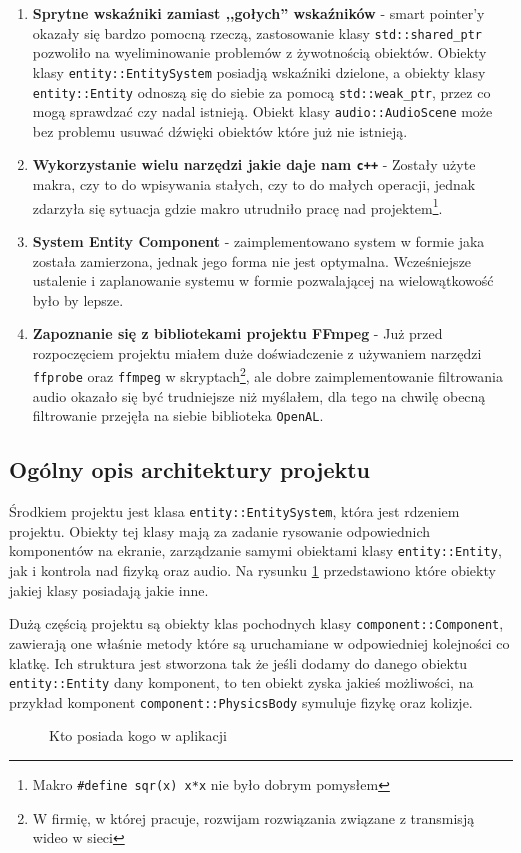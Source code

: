 \documentclass[a4paper,11pt]{article}
\begin{document}
\begin{enumerate}
    \item \textbf{Sprytne wskaźniki zamiast ,,gołych'' wskaźników} - smart pointer'y okazały się bardzo pomocną rzeczą, zastosowanie klasy \texttt{std::shared\_ptr} pozwoliło na wyeliminowanie problemów z żywotnością obiektów. Obiekty klasy \texttt{entity::EntitySystem} posiadją wskaźniki dzielone, a obiekty klasy \texttt{entity::Entity} odnoszą się do siebie za pomocą \texttt{std::weak\_ptr}, przez co mogą sprawdzać czy nadal istnieją. Obiekt klasy \texttt{audio::AudioScene} może bez problemu usuwać dźwięki obiektów które już nie istnieją.
    \item \textbf{Wykorzystanie wielu narzędzi jakie daje nam \texttt{c++}} - Zostały użyte makra, czy to do wpisywania stałych, czy to do małych operacji, jednak zdarzyła się sytuacja gdzie makro utrudniło pracę nad projektem\footnote{Makro \texttt{\#define sqr(x) x*x} nie było dobrym pomysłem}.
    \item \textbf{System Entity Component} - zaimplementowano system w formie jaka została zamierzona, jednak jego forma nie jest optymalna. Wcześniejsze ustalenie i zaplanowanie systemu w formie pozwalającej na wielowątkowość było by lepsze.
    \item \textbf{Zapoznanie się z bibliotekami projektu FFmpeg} - Już przed rozpoczęciem projektu miałem duże doświadczenie z używaniem narzędzi \texttt{ffprobe} oraz \texttt{ffmpeg} w skryptach\footnote{W firmię, w której pracuje, rozwijam rozwiązania związane z transmisją wideo w sieci}, ale dobre zaimplementowanie filtrowania audio okazało się być trudniejsze niż myślałem, dla tego na chwilę obecną filtrowanie przejęła na siebie biblioteka \texttt{OpenAL}.
\end{enumerate}

\subsection{Ogólny opis architektury projektu}

Środkiem projektu jest klasa \texttt{entity::EntitySystem}, która jest rdzeniem projektu. Obiekty tej klasy mają za zadanie rysowanie odpowiednich komponentów na ekranie, zarządzanie samymi obiektami klasy \texttt{entity::Entity}, jak i kontrola nad fizyką oraz audio. Na rysunku \ref{rys:owners} przedstawiono które obiekty jakiej klasy posiadają jakie inne.

Dużą częścią projektu są obiekty klas pochodnych klasy \texttt{component::Component}, zawierają one właśnie metody które są uruchamiane w odpowiedniej kolejności co klatkę. Ich struktura jest stworzona tak że jeśli dodamy do danego obiektu \texttt{entity::Entity} dany komponent, to ten obiekt zyska jakieś możliwości, na przykład komponent \texttt{component::PhysicsBody} symuluje fizykę oraz kolizje.
\begin{figure}
    \resizebox{\textwidth}{!}{%
    }
    \centering
    \caption{Kto posiada kogo w aplikacji}\label{rys:owners}
\end{figure}
\end{document}
